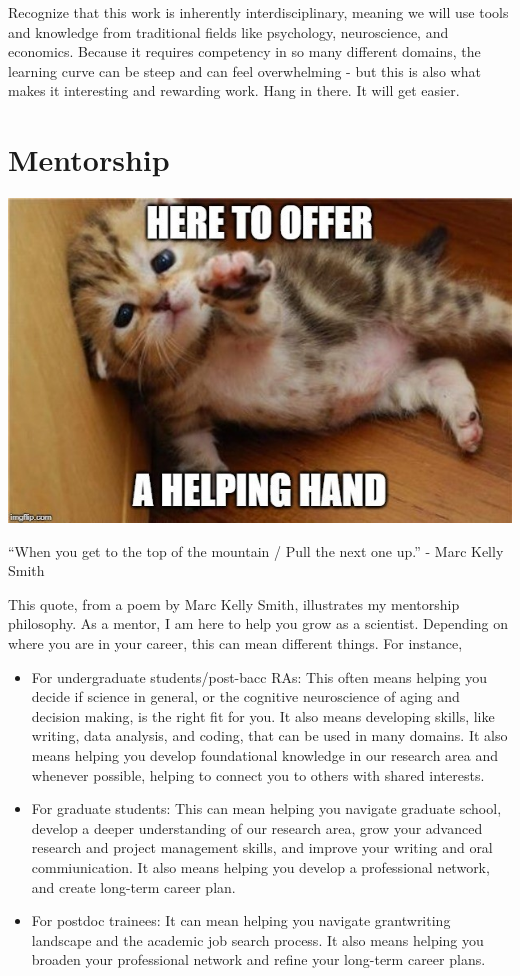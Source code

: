 \documentclass[
]{book}
\begin{document}
Recognize that this work is inherently interdisciplinary, meaning we will use tools and knowledge from traditional fields like psychology, neuroscience, and economics. Because it requires competency in so many different domains, the learning curve can be steep and can feel overwhelming - but this is also what makes it interesting and rewarding work. Hang in there. It will get easier.

\hypertarget{mentorship}{%
\section{Mentorship}\label{mentorship}}

\includegraphics{images/help.jpeg}

``When you get to the top of the mountain / Pull the next one up.'' - Marc Kelly Smith

This quote, from a poem by Marc Kelly Smith, illustrates my mentorship philosophy. As a mentor, I am here to help you grow as a scientist. Depending on where you are in your career, this can mean different things. For instance,

\begin{itemize}
\item
  For undergraduate students/post-bacc RAs: This often means helping you decide if science in general, or the cognitive neuroscience of aging and decision making, is the right fit for you. It also means developing skills, like writing, data analysis, and coding, that can be used in many domains. It also means helping you develop foundational knowledge in our research area and whenever possible, helping to connect you to others with shared interests.
\item
  For graduate students: This can mean helping you navigate graduate school, develop a deeper understanding of our research area, grow your advanced research and project management skills, and improve your writing and oral commiunication. It also means helping you develop a professional network, and create long-term career plan.
\item
  For postdoc trainees: It can mean helping you navigate grantwriting landscape and the academic job search process. It also means helping you broaden your professional network and refine your long-term career plans.
\end{itemize}
\end{document}

